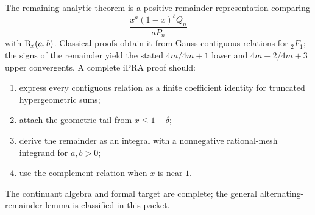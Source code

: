The remaining analytic theorem is a positive-remainder representation comparing
\[
 \frac{x^a(1-x)^bQ_n}{aP_n}
\]
with $\mathrm B_x(a,b)$.  Classical proofs obtain it from Gauss contiguous relations for ${}_2F_1$; the signs of the remainder yield the stated $4m/4m+1$ lower and $4m+2/4m+3$ upper convergents.  A complete iPRA proof should:
\begin{enumerate}
\item express every contiguous relation as a finite coefficient identity for truncated hypergeometric sums;
\item attach the geometric tail from $x\le1-\delta$;
\item derive the remainder as an integral with a nonnegative rational-mesh integrand for $a,b>0$;
\item use the complement relation when $x$ is near $1$.
\end{enumerate}
The continuant algebra and formal target are complete; the general alternating-remainder lemma is classified \statusC{} in this packet.

